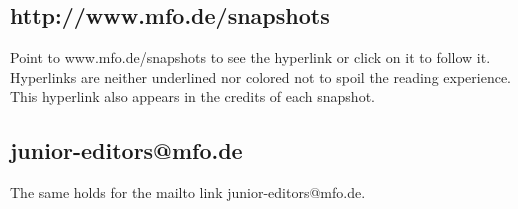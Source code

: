 \documentclass{snapshotmfo}
\begin{document}
\subsection{http://www.mfo.de/snapshots}
Point to www.mfo.de/snapshots to see the hyperlink or click on it to follow it. Hyperlinks are neither underlined nor colored not to spoil the reading experience. This hyperlink also appears in the credits of each snapshot.

\subsection{junior-editors@mfo.de}
The same holds for the mailto link junior-editors@mfo.de.
\end{document}
